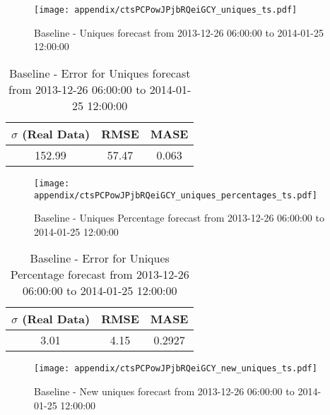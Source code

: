 \begin{figure}[H] \begin{center} \leavevmode
\texttt{[image: appendix/ctsPCPowJPjbRQeiGCY\_uniques\_ts.pdf]} \caption[]{
Baseline - Uniques forecast from 2013-12-26 06:00:00 to 2014-01-25 12:00:00} \label{fig:appendix/ctsPCPowJPjbRQeiGCY_uniques_ts.pdf} \end{center}
\end{figure}

\begin{table}[H]
\centering
\footnotesize
\begin{tabular}{ccc}
$\sigma$ (Real Data) & RMSE & MASE   \\ \hline
152.99 & 57.47 & 0.063 \\
\end{tabular}

\vspace{0.5cm}

\caption[]{
Baseline - Error for Uniques forecast from 2013-12-26 06:00:00 to 2014-01-25 12:00:00}
\end{table}

\begin{figure}[H] \begin{center} \leavevmode
\texttt{[image: appendix/ctsPCPowJPjbRQeiGCY\_uniques\_percentages\_ts.pdf]} \caption[]{
Baseline - Uniques Percentage forecast from 2013-12-26 06:00:00 to 2014-01-25 12:00:00} \label{fig:appendix/ctsPCPowJPjbRQeiGCY_uniques_percentages_ts.pdf} \end{center}
\end{figure}

\begin{table}[H]
\centering
\footnotesize
\begin{tabular}{ccc}
$\sigma$ (Real Data) & RMSE & MASE   \\ \hline
3.01 & 4.15 & 0.2927 \\
\end{tabular}

\vspace{0.5cm}

\caption[]{
Baseline - Error for Uniques Percentage forecast from 2013-12-26 06:00:00 to 2014-01-25 12:00:00}
\end{table}

\begin{figure}[H] \begin{center} \leavevmode
\texttt{[image: appendix/ctsPCPowJPjbRQeiGCY\_new\_uniques\_ts.pdf]} \caption[]{
Baseline - New uniques forecast from 2013-12-26 06:00:00 to 2014-01-25 12:00:00} \label{fig:appendix/ctsPCPowJPjbRQeiGCY_new_uniques_ts.pdf} \end{center}
\end{figure}

